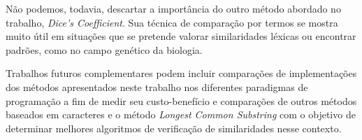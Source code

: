\documentclass[12pt]{article}
\begin{document}
Não podemos, todavia, descartar a importância do outro método abordado no trabalho, \textit{Dice's Coefficient}. Sua técnica de comparação por termos se mostra muito útil em situações que se pretende valorar similaridades léxicas ou encontrar padrões, como no campo genético da biologia.

Trabalhos futuros complementares podem incluir comparações de implementações dos métodos apresentados neste trabalho nos diferentes paradigmas de programação a fim de medir seu custo-benefício e comparações de outros métodos baseados em caracteres e o método \textit{Longest Common Substring} com o objetivo de determinar melhores algoritmos de verificação de similaridades nesse contexto.



\end{document}
